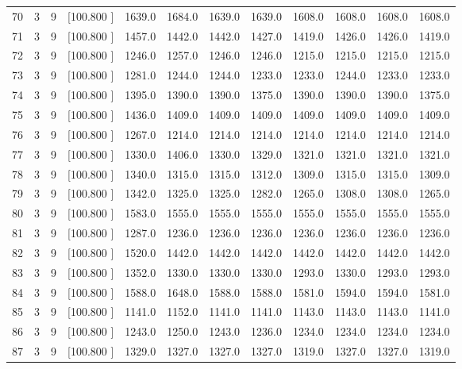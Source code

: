 \documentclass[12pt,a4paper]{article}
\begin{document}
\begin{center}
{\begin{tabular}{r r r r r r r r r r r r}
  70&  3&  9&[100.800   ]&  1639.0&  1684.0&  1639.0&  1639.0&  1608.0&  1608.0&  1608.0&  1608.0\\[-0.02in]
  71&  3&  9&[100.800   ]&  1457.0&  1442.0&  1442.0&  1427.0&  1419.0&  1426.0&  1426.0&  1419.0\\[-0.02in]
  72&  3&  9&[100.800   ]&  1246.0&  1257.0&  1246.0&  1246.0&  1215.0&  1215.0&  1215.0&  1215.0\\[-0.02in]
  73&  3&  9&[100.800   ]&  1281.0&  1244.0&  1244.0&  1233.0&  1233.0&  1244.0&  1233.0&  1233.0\\[-0.02in]
  74&  3&  9&[100.800   ]&  1395.0&  1390.0&  1390.0&  1375.0&  1390.0&  1390.0&  1390.0&  1375.0\\[-0.02in]
  75&  3&  9&[100.800   ]&  1436.0&  1409.0&  1409.0&  1409.0&  1409.0&  1409.0&  1409.0&  1409.0\\[-0.02in]
  76&  3&  9&[100.800   ]&  1267.0&  1214.0&  1214.0&  1214.0&  1214.0&  1214.0&  1214.0&  1214.0\\[-0.02in]
  77&  3&  9&[100.800   ]&  1330.0&  1406.0&  1330.0&  1329.0&  1321.0&  1321.0&  1321.0&  1321.0\\[-0.02in]
  78&  3&  9&[100.800   ]&  1340.0&  1315.0&  1315.0&  1312.0&  1309.0&  1315.0&  1315.0&  1309.0\\[-0.02in]
  79&  3&  9&[100.800   ]&  1342.0&  1325.0&  1325.0&  1282.0&  1265.0&  1308.0&  1308.0&  1265.0\\[-0.02in]
  80&  3&  9&[100.800   ]&  1583.0&  1555.0&  1555.0&  1555.0&  1555.0&  1555.0&  1555.0&  1555.0\\[-0.02in]
  81&  3&  9&[100.800   ]&  1287.0&  1236.0&  1236.0&  1236.0&  1236.0&  1236.0&  1236.0&  1236.0\\[-0.02in]
  82&  3&  9&[100.800   ]&  1520.0&  1442.0&  1442.0&  1442.0&  1442.0&  1442.0&  1442.0&  1442.0\\[-0.02in]
  83&  3&  9&[100.800   ]&  1352.0&  1330.0&  1330.0&  1330.0&  1293.0&  1330.0&  1293.0&  1293.0\\[-0.02in]
  84&  3&  9&[100.800   ]&  1588.0&  1648.0&  1588.0&  1588.0&  1581.0&  1594.0&  1594.0&  1581.0\\[-0.02in]
  85&  3&  9&[100.800   ]&  1141.0&  1152.0&  1141.0&  1141.0&  1143.0&  1143.0&  1143.0&  1141.0\\[-0.02in]
  86&  3&  9&[100.800   ]&  1243.0&  1250.0&  1243.0&  1236.0&  1234.0&  1234.0&  1234.0&  1234.0\\[-0.02in]
  87&  3&  9&[100.800   ]&  1329.0&  1327.0&  1327.0&  1327.0&  1319.0&  1327.0&  1327.0&  1319.0\\[-0.02in]

\end{tabular}}
\end{center}
\end{document}
